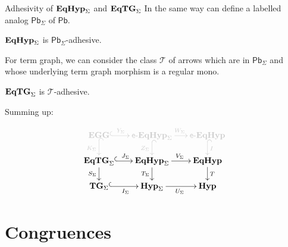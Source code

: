 \documentclass{beamer}
\newcommand{\catname}[1]{\textbf{\textup{#1}}}
\newcommand{\tg}[0]{\catname{TG}_{\Sigma}}
\newcommand{\eg}{\catname{EGG}}
\newcommand{\egg}{\mathsf{e}\text{-}\catname{EqHyp}}
\newcommand{\hyp}{\catname{Hyp}}
\newcommand{\EqHyp}{\catname{EqHyp}} %
\newcommand{\EqTG}{\catname{EqTG}}
\newcommand{\pbc}{\mathsf{Pb}}
\begin{document}
\begin{frame}{Adhesivity of $\EqHyp_\Sigma$ and $\EqTG_{\Sigma}$}
	In the same way can define a labelled analog $\pbc_\Sigma$ of $\pbc$.
	\pause 
	\begin{theorem}
		$\EqHyp_\Sigma$ is $\pbc_\Sigma$-adhesive.
	\end{theorem} 
	
	\pause 
	For term graph, we can consider the class $\mathcal{T}$ of arrows which are in $\pbc_\Sigma$ and whose underlying term graph morphism is a regular mono.
	
	\pause 
	\begin{theorem}
		$\EqTG_{\Sigma}$ is $\mathcal{T}$-adhesive.
	\end{theorem}
	
	
\end{frame}



\begin{frame}
	
	Summing up:
	
	
	\[\xymatrix@R=15pt@C=15pt{ \color{shaded}\eg \ar@{^{(}->}@[shaded][r]^-{\color{shaded}Y_\Sigma} \ar@{^{(}->}@[shaded][d]_{\color{shaded}K_\Sigma} & \color{shaded}\egg_\Sigma \ar@{^{(}->}@[shaded][d]_{\color{shaded} Z_\Sigma} \ar@[shaded][r]^{\color{shaded}W_\Sigma}&\color{shaded} \egg \ar@{^{(}->}@[shaded][d]^{\color{shaded}I}\\ \EqTG_{\Sigma} \ar@{^{(}->}[r]^{J_\Sigma}\ar[d]_{S_\Sigma}& \EqHyp_\Sigma \ar[r]^{V_\Sigma} \ar[d]_{T_\Sigma}& \EqHyp \ar[d]^{T}\\ \tg \ar@{^{(}->}[r]_{I_\Sigma}& \hyp_{\Sigma} \ar[r]_{U_\Sigma}  &\hyp}\]
	
\end{frame}

\section{Congruences}
\end{document}
